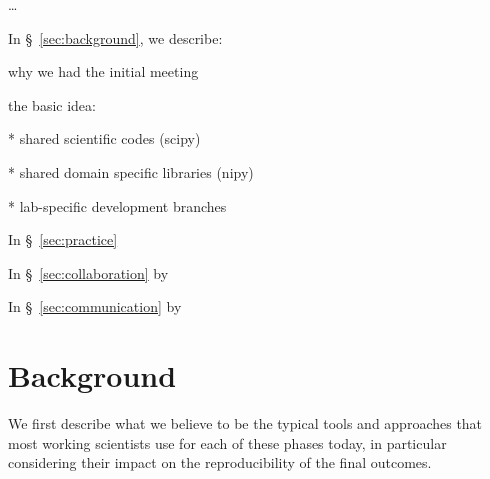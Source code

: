 \documentclass[ChapterTOCs,krantz2]{krantz} %
\theoremstyle{definition}
\begin{document}
\ldots

In §~\ref{sec:background}, we describe:

why we had the initial meeting

the basic idea:

* shared scientific codes (scipy)

* shared domain specific libraries (nipy)

* lab-specific development branches

In §~\ref{sec:practice} 

In §~\ref{sec:collaboration} by

In §~\ref{sec:communication} by



\section{\label{sec:background}Background}

We first describe what we believe to be the typical tools and approaches that
most working scientists use for each of these phases today, in particular
considering their impact on the reproducibility of the final outcomes. 
\end{document}
